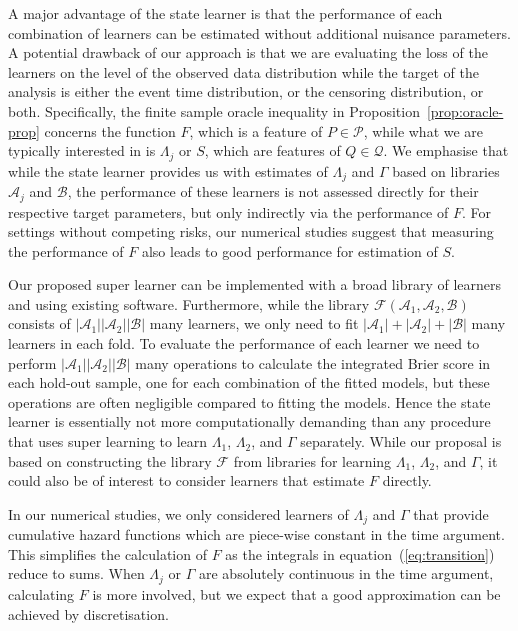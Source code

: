 \documentclass[a4paper,danish]{article}
\theoremstyle{plain} %
\numberwithin{theorem}{section}
\theoremstyle{definition} %
\theoremstyle{remark}
\newcommand{\1}{\mathds{1}}
\begin{document}
A major advantage of the state learner is that the performance of each
combination of learners can be estimated without additional nuisance
parameters. A potential drawback of our approach is that we are
evaluating the loss of the learners on the level of the observed data
distribution while the target of the analysis is either the event time
distribution, or the censoring distribution, or both.
Specifically, the finite sample oracle inequality in
Proposition~\ref{prop:oracle-prop} concerns the function \( F \), which
is a feature of \( P \in \mathcal{P} \), while what we are typically
interested in is \( \Lambda_j \) or \( S \), which are features of
\( Q \in \mathcal{Q} \). We emphasise that while the state learner
provides us with estimates of \( \Lambda_j \) and $\Gamma$ based on
libraries \( \mathcal{A}_j \) and \( \mathcal{B} \), the performance
of these learners is not assessed directly for their respective target
parameters, but only indirectly via the performance of \( F \).  For
settings without competing risks, our numerical studies suggest that
measuring the performance of \( F \) also leads to good performance
for estimation of \( S \).

Our proposed super learner can be implemented with a broad library of learners
and using existing software.
Furthermore, while
the library \( \mathcal{F}(\mathcal{A}_1,\mathcal{A}_2,\mathcal{B}) \) consists
of \( |\mathcal{A}_1||\mathcal{A}_2||\mathcal{B}| \) many learners, we only need to fit
\( |\mathcal{A}_1| +|\mathcal{A}_2| + |\mathcal{B}| \) many learners in each fold. To
evaluate the performance of each learner we need to perform
\( |\mathcal{A}_1||\mathcal{A}_2||\mathcal{B}| \) many operations to calculate the
integrated Brier score in each hold-out sample, one for each combination of the
fitted models, but these operations are often negligible compared to fitting the
models. Hence the state learner is essentially not more computationally demanding
than any procedure that uses super learning to learn $\Lambda_1$, $\Lambda_2$,
and $\Gamma$ separately. While our proposal is based on constructing the library
\( \mathcal{F} \) from libraries for learning \( \Lambda_1 \), $\Lambda_2$, and
$\Gamma$, it could also be of interest to consider learners that estimate
\( F \) directly.

In our numerical studies, we only considered learners of $\Lambda_j$ and
$\Gamma$ that provide cumulative hazard functions which are piece-wise constant
in the time argument. This simplifies the calculation of \( F \) as the
integrals in equation~(\ref{eq:transition}) reduce to sums. When $\Lambda_j$ or
\( \Gamma \) are absolutely continuous in the time argument, calculating \( F \)
is more involved, but we expect that a good approximation can be achieved by
discretisation.
\end{document}
